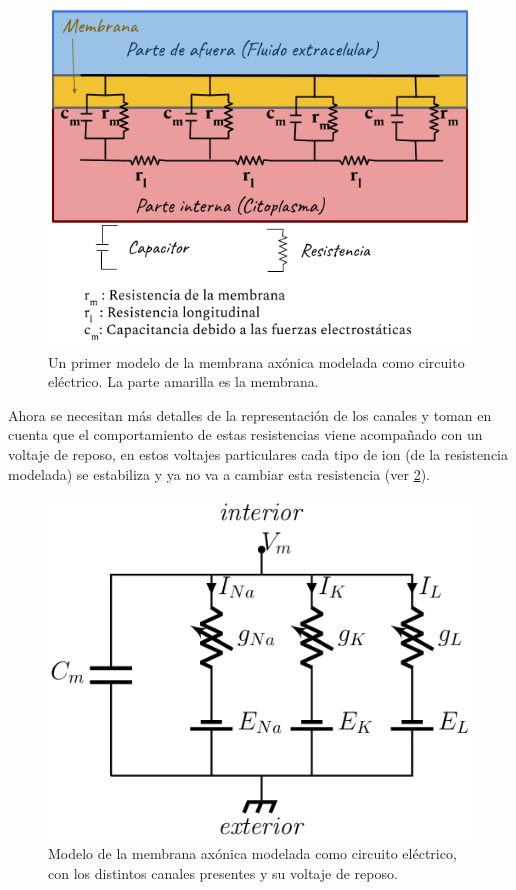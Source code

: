 \begin{figure}[h]
 \centering
 \includegraphics[scale=0.5]{../Figuras/ModeloHH.2}
 \caption{Un primer modelo de la membrana axónica modelada como circuito eléctrico. La parte amarilla es la membrana.}
 \label{fig:ModelHh}
\end{figure}


Ahora se necesitan más detalles de la representación de los canales y toman en cuenta que el comportamiento de estas resistencias viene acompañado con un voltaje de reposo, en estos voltajes particulares cada tipo de ion (de la resistencia modelada) se estabiliza y ya no va a cambiar esta resistencia (ver \ref{fig:circuito}). 


\begin{figure}[h]
 \centering
 \includegraphics[scale=0.5]{../Figuras/circuito.png}
 \caption{Modelo de la membrana axónica modelada como circuito eléctrico, con los distintos canales presentes y su voltaje de reposo.}
 \label{fig:circuito}
\end{figure}

